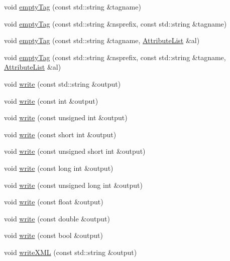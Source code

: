 \begin{DoxyCompactItemize}
void \mbox{\hyperlink{classXMLWriterAPI_1_1XMLSimpleWriter_ae75e5988a4d97721ee9be5c7a18abfc4}{empty\+Tag}} (const std\+::string \&tagname)
\item 
void \mbox{\hyperlink{classXMLWriterAPI_1_1XMLSimpleWriter_a91df124fb76053c30cd8ca1a8dc779e9}{empty\+Tag}} (const std\+::string \&nsprefix, const std\+::string \&tagname)
\item 
void \mbox{\hyperlink{classXMLWriterAPI_1_1XMLSimpleWriter_a5246369b7cd462e29546da9beb7bdc33}{empty\+Tag}} (const std\+::string \&tagname, \mbox{\hyperlink{namespaceXMLWriterAPI_a28cf3d8051a4ccf0aef208b7ebc66d07}{Attribute\+List}} \&al)
\item 
void \mbox{\hyperlink{classXMLWriterAPI_1_1XMLSimpleWriter_aa5572c81fdebc241db0eac912f0b2b73}{empty\+Tag}} (const std\+::string \&nsprefix, const std\+::string \&tagname, \mbox{\hyperlink{namespaceXMLWriterAPI_a28cf3d8051a4ccf0aef208b7ebc66d07}{Attribute\+List}} \&al)
\item 
void \mbox{\hyperlink{classXMLWriterAPI_1_1XMLSimpleWriter_a1c5de7aca63e28a5e02a3f054a2b2a75}{write}} (const std\+::string \&output)
\item 
void \mbox{\hyperlink{classXMLWriterAPI_1_1XMLSimpleWriter_a2a072319bedcf9fe4ebe991ecd549b56}{write}} (const int \&output)
\item 
void \mbox{\hyperlink{classXMLWriterAPI_1_1XMLSimpleWriter_a07831082bd1741aab15b9ec8f0e4042b}{write}} (const unsigned int \&output)
\item 
void \mbox{\hyperlink{classXMLWriterAPI_1_1XMLSimpleWriter_a3a512bd09f82648b2f711bf5817bd581}{write}} (const short int \&output)
\item 
void \mbox{\hyperlink{classXMLWriterAPI_1_1XMLSimpleWriter_a6d2718e6dd405323aa2e5647fa6a6173}{write}} (const unsigned short int \&output)
\item 
void \mbox{\hyperlink{classXMLWriterAPI_1_1XMLSimpleWriter_a73b030baaf35f5bcb6983de4a133aaf2}{write}} (const long int \&output)
\item 
void \mbox{\hyperlink{classXMLWriterAPI_1_1XMLSimpleWriter_ab905de2de9ab01d4f9d7ae2a5489b19b}{write}} (const unsigned long int \&output)
\item 
void \mbox{\hyperlink{classXMLWriterAPI_1_1XMLSimpleWriter_a0535163fab1b55474edc3e31a52b0c61}{write}} (const float \&output)
\item 
void \mbox{\hyperlink{classXMLWriterAPI_1_1XMLSimpleWriter_a0dc9bdc6334665f7197afbae1139311d}{write}} (const double \&output)
\item 
void \mbox{\hyperlink{classXMLWriterAPI_1_1XMLSimpleWriter_a34886bbfabe67974b8789b070ac27234}{write}} (const bool \&output)
\item 
void \mbox{\hyperlink{classXMLWriterAPI_1_1XMLSimpleWriter_a83601254ff259af02e51d627b4fd4b1b}{write\+X\+ML}} (const std\+::string \&output)
\end{DoxyCompactItemize}
